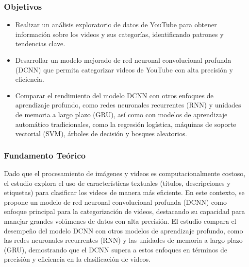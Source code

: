 \subsubsection{Objetivos}
\begin{itemize}
	\item Realizar un análisis exploratorio de datos de YouTube para obtener información sobre los videos y sus categorías, identificando patrones y tendencias clave.
	\item Desarrollar un modelo mejorado de red neuronal convolucional profunda (DCNN) que permita categorizar videos de YouTube con alta precisión y eficiencia.
	\item Comparar el rendimiento del modelo DCNN con otros enfoques de aprendizaje profundo, como redes neuronales recurrentes (RNN) y unidades de memoria a largo plazo (GRU), así como con modelos de aprendizaje automático tradicionales, como la regresión logística, máquinas de soporte vectorial (SVM), árboles de decisión y bosques aleatorios.
\end{itemize}

\subsubsection {Fundamento Teórico}
Dado que el procesamiento de imágenes y videos es computacionalmente costoso, el estudio explora el uso de características textuales (títulos, descripciones y etiquetas) para clasificar los videos de manera más eficiente. En este contexto, se propone un modelo de red neuronal convolucional profunda (DCNN) como enfoque principal para la categorización de videos, destacando su capacidad para manejar grandes volúmenes de datos con alta precisión. El estudio compara el desempeño del modelo DCNN con otros modelos de aprendizaje profundo, como las redes neuronales recurrentes (RNN) y las unidades de memoria a largo plazo (GRU), demostrando que el DCNN supera a estos enfoques en términos de precisión y eficiencia en la clasificación de videos.
